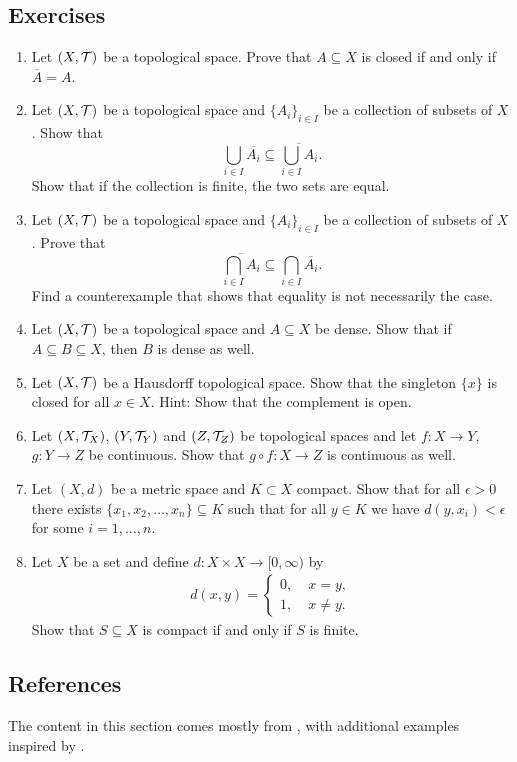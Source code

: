 \documentclass{article}
\begin{document}
\subsection{Exercises}
\begin{enumerate}
    \item Let $(X, \mathcal{T})$ be a topological space. Prove that $A\subseteq X$ is closed if and only if $\overline{A} =A$.
    \item Let $(X,\mathcal{T})$ be a topological space and $\{A_i\}_{i\in I}$ be a collection of subsets of $X$. Show that 
    \begin{equation*}
        \bigcup_{i\in I}\overline{A_i} \subseteq \overline{\bigcup_{i\in I}A_i}.
    \end{equation*}
    Show that if the collection is finite, the two sets are equal. 
    \item Let $(X,\mathcal{T})$ be a topological space and $\{A_i\}_{i\in I}$ be a collection of subsets of $X$. Prove that 
    \begin{equation*}
        \overline{\bigcap_{i\in I}A_i} \subseteq \bigcap_{i\in I}\overline{A_i}.
    \end{equation*}
    Find a counterexample that shows that equality is not necessarily the case.
    \item Let $(X,\mathcal{T})$ be a topological space and $A\subseteq X$ be dense. Show that if $A\subseteq B\subseteq X$, then $B$ is dense as well. 
    \item Let $(X,\mathcal{T})$ be a Hausdorff topological space. Show that the singleton $\{x\}$ is closed for all $x\in X$. Hint: Show that the complement is open. 
    \item Let $(X,\mathcal{T}_X)$, $(Y,\mathcal{T}_Y)$ and $(Z,\mathcal{T}_Z)$ be topological spaces and let $f\colon X\to Y$, $g\colon Y \to Z$ be continuous. Show that $g\circ f \colon X \to Z$ is continuous as well. 
    \item Let $(X, d)$ be a metric space and $K \subset X$ compact. Show that for all $\epsilon>0$ there exists $\{x_1,x_2,\ldots, x_n\}\subseteq K$  such that for all $y\in K$ we have $d(y,x_i)<\epsilon$ for some $i=1,\ldots,n$.
    \item Let $X$ be a set and define $d\colon X \times X \to [0,\infty)$ by 
    \begin{align*}
        d(x,y) = \begin{cases}
            0, & \; x=y, \\
            1, & \; x\neq y.
        \end{cases}
    \end{align*}
    Show that $S\subseteq X$ is compact if and only if $S$ is finite.
\end{enumerate}

\subsection{References}
The content in this section comes mostly from \cite{tastetopology}, with additional examples inspired by \cite{marcoux2019}.


% 
%
\end{document}
